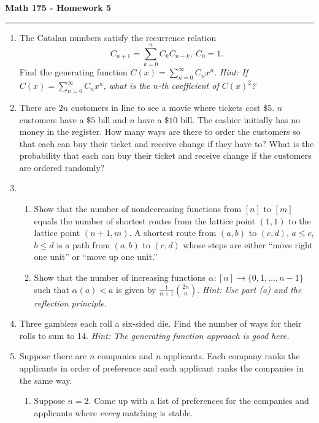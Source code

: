 \documentclass[11pt,letterpaper]{report}
\begin{document}
\begin{center}
{\bf \Large Math 175 - Homework 5}
\vspace{0.2cm}
\hrule
\end{center}

\begin{enumerate}
	\item The Catalan numbers satisfy the recurrence relation
	\[
	C_{n+1} = \sum_{k=0}^nC_kC_{n-k},\ C_0 = 1.
	\]
	Find the generating function $C(x) = \sum_{n=0}^\infty C_nx^n$. \textit{Hint: If $C(x) = \sum_{n=0}^\infty C_nx^n$, what is the $n$-th coefficient of $C(x)^2$?}

	\vfill

	\item There are $2n$ customers in line to see a movie where tickets cost $\$5$. $n$ customers have a $\$5$ bill and $n$ have a $\$10$ bill. The cashier initially has no money in the register. How many ways are there to order the customers so that each can buy their ticket and receive change if they have to? What is the probability that each can buy their ticket and receive change if the customers are ordered randomly?
	\vfill

	\item \begin{enumerate}
		\item Show that the number of nondecreasing functions from $[n]$ to $[m]$ equals the number of shortest routes from the lattice point $(1, 1)$ to the lattice point $(n+1, m)$. A shortest route from $(a,b)$ to $(c,d)$, $a\leq c$, $b\leq d$ is a path from $(a,b)$ to $(c,d)$ whose steps are either ``move right one unit'' or ``move up one unit.''
		\vfill
		\item Show that the number of increasing functions $\alpha: [n]\to \{0, 1, \ldots, n-1\}$ such that $\alpha(a)<a$ is given by $\frac{1}{n+1}\binom{2n}{n}$. \textit{Hint: Use part (a) and the reflection principle.}
		\vfill
	\end{enumerate}

	\item Three gamblers each roll a six-sided die. Find the number of ways for their rolls to sum to 14. \textit{Hint: The generating function approach is good here.}
	\vfill


	\item Suppose there are $n$ companies and $n$ applicants. Each company ranks the applicants in order of preference and each applicant ranks the companies in the same way.
	\begin{enumerate}
		\item Suppose $n = 2$. Come up with a list of preferences for the companies and applicants where \textit{every} matching is stable.


\end{enumerate}
\end{enumerate}
\end{document}
